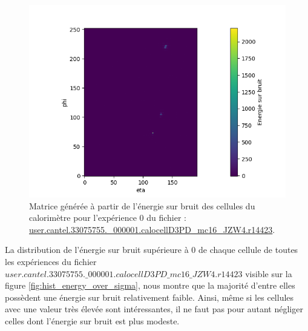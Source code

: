 \begin{figure}[hbt!]
    \centering
    \includegraphics[scale=0.7]{Figures/dataset/matrix_post_energy_over_noise_no_filter.png}
    \caption{Matrice générée à partir de l'énergie sur bruit des cellules du calorimètre pour l'expérience 0 du fichier : \url{user.cantel.33075755.\_000001.calocellD3PD\_mc16\_JZW4.r14423}.}
    \label{fig:matrix_post_energy_over_noise_no_filter}
\end{figure}

\break

La distribution de l'énergie sur bruit supérieure à $0$ de chaque cellule de toutes les expériences du fichier $user.cantel.33075755.\_000001.calocellD3PD\_mc16\_JZW4.r14423$ visible sur la figure \ref{fig:hist_energy_over_sigma}, nous montre que la majorité d'entre elles possèdent une énergie sur bruit relativement faible. Ainsi, même si les cellules avec une valeur très élevée sont intéressantes, il ne faut pas pour autant négliger celles dont l'énergie sur bruit est plus modeste.

